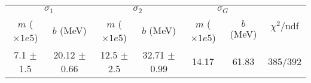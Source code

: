 \begin{tabular}{cc|cc|cc||c}
\multicolumn{2}{c|}{$\sigma_1$} & \multicolumn{2}{|c}{$\sigma_2$} & \multicolumn{2}{|c}{$\sigma_G$}  & \multirow{2}{*}{$\chi^2/$ndf}\\
$m$ ($\times1e5$) & $b$ (MeV) & $m$ ($\times1e5$) & $b$ (MeV) & $m$ ($\times1e5$) & $b$ (MeV) & \\
\hline
7.1 $\pm$ 1.5 & 20.12 $\pm$ 0.66 & 12.5 $\pm$ 2.5 & 32.71 $\pm$ 0.99 & 14.17 & 61.83 & 385/392\\
\end{tabular}
